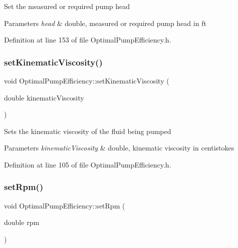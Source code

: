 Set the measured or required pump head 
\begin{DoxyParams}{Parameters}
{\em head} & double, measured or required pump head in ft \\
\hline
\end{DoxyParams}


Definition at line 153 of file Optimal\+Pump\+Efficiency.\+h.

\mbox{\label{class_optimal_pump_efficiency_a00017e0bd100beb2f4b0bf2db5e3687f}} 
\subsubsection{\texorpdfstring{set\+Kinematic\+Viscosity()}{setKinematicViscosity()}}
{\footnotesize\ttfamily void Optimal\+Pump\+Efficiency\+::set\+Kinematic\+Viscosity (\begin{DoxyParamCaption}\item[{double}]{kinematic\+Viscosity }\end{DoxyParamCaption})\hspace{0.3cm}{\ttfamily [inline]}}

Sets the kinematic viscosity of the fluid being pumped 
\begin{DoxyParams}{Parameters}
{\em kinematic\+Viscosity} & double, kinematic viscosity in centistokes \\
\hline
\end{DoxyParams}


Definition at line 105 of file Optimal\+Pump\+Efficiency.\+h.

\mbox{\label{class_optimal_pump_efficiency_afc6b6f46b4e289efc8819249ad1c9fb5}} 
\subsubsection{\texorpdfstring{set\+Rpm()}{setRpm()}}
{\footnotesize\ttfamily void Optimal\+Pump\+Efficiency\+::set\+Rpm (\begin{DoxyParamCaption}\item[{double}]{rpm }\end{DoxyParamCaption})\hspace{0.3cm}{\ttfamily [inline]}}

